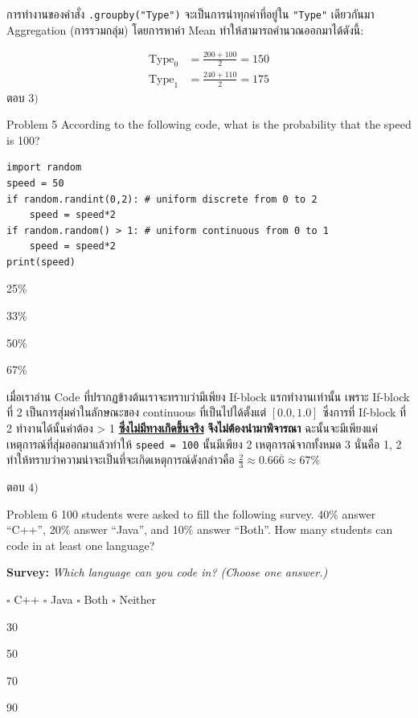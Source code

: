 \documentclass[11pt]{scrartcl}
\begin{document}
\begin{solutionbox}
  การทำงานของคำสั่ง \texttt{.groupby("Type")} จะเป็นการนำทุกค่าที่อยู่ใน \texttt{"Type"} เดียวกันมา Aggregation (การรวมกลุ่ม) โดยการหาค่า Mean ทำให้สามารถคำนวณออกมาได้ดังนี้:

  \begin{align*}
    \text{Type}_0 &= \frac{200+100}{2} = 150 \\
    \text{Type}_1 &= \frac{240+110}{2} = 175
  \end{align*}
  ตอบ $\boxed{3)}$
\end{solutionbox}

\newpage

\begin{problembox}{Problem 5}
According to the following code, what is the probability that the speed is 100?

\begin{lstlisting}
import random
speed = 50
if random.randint(0,2): # uniform discrete from 0 to 2
    speed = speed*2
if random.random() > 1: # uniform continuous from 0 to 1
    speed = speed*2
print(speed)
\end{lstlisting}

\begin{choices}
\item 25\%
\item 33\%
\item 50\%
\item 67\%
\end{choices}
\end{problembox}

\begin{solutionbox}
  เมื่อเราอ่าน Code ที่ปรากฏข้างต้นเราจะทราบว่ามีเพียง If-block แรกทำงานเท่านั้น เพราะ If-block ที่ 2 เป็นการสุ่มค่าในลักษณะของ continuous ที่เป็นไปได้ตั้งแต่ $[0.0, 1.0]$ 
  ซึ่งการที่ If-block ที่ 2 ทำงานได้นั้นค่าต้อง > 1 \underline{\textbf{ซึ่งไม่มีทางเกิดขึ้นจริง}} \textbf{จึงไม่ต้องนำมาพิจารณา}
  ฉะนั้นจะมีเพียงแค่เหตุการณ์ที่สุ่มออกมาแล้วทำให้ \texttt{speed = 100} นั้นมีเพียง 2 เหตุการณ์จากทั้งหมด 3 นั่นคือ 1, 2
  ทำให้ทราบว่าความน่าจะเป็นที่จะเกิดเหตุการณ์ดังกล่าวคือ $\frac{2}{3} \approx 0.66\overline{6} \approx 67\%$

  ตอบ $\boxed{4)}$
\end{solutionbox}

\begin{problembox}{Problem 6}
100 students were asked to fill the following survey. 40\% answer “C++”, 20\% answer “Java”, and 10\% answer “Both”. How many students can code in at least one language?

\textbf{Survey:} \textit{Which language can you code in? (Choose one answer.)}


\vspace{3pt}
$\square$ C++ \hfill $\square$ Java \hfill $\square$ Both \hfill $\square$ Neither

\begin{choices}
\item 30
\item 50
\item 70
\item 90
\end{choices}
\end{problembox}
\end{document}
